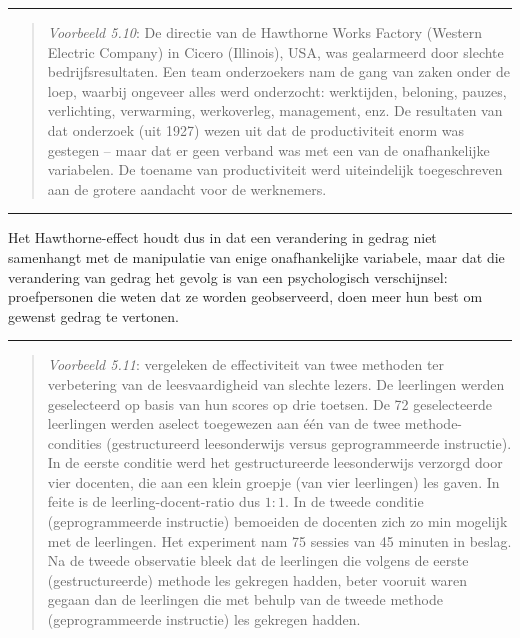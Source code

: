 \documentclass[
]{book}
\begin{document}
\begin{center}\rule{0.5\linewidth}{0.5pt}\end{center}

\begin{quote}
\emph{Voorbeeld 5.10}: De directie
van de Hawthorne Works Factory (Western Electric Company) in Cicero
(Illinois), USA, was gealarmeerd door slechte bedrijfsresultaten. Een
team onderzoekers nam de gang van zaken onder de loep, waarbij ongeveer
alles werd onderzocht: werktijden, beloning, pauzes, verlichting,
verwarming, werkoverleg, management, enz. De resultaten van dat
onderzoek (uit 1927) wezen uit dat de productiviteit enorm was gestegen
-- maar dat er geen verband was met een van de onafhankelijke
variabelen. De toename van productiviteit werd uiteindelijk
toegeschreven aan de grotere aandacht voor de werknemers.
\end{quote}

\begin{center}\rule{0.5\linewidth}{0.5pt}\end{center}

Het Hawthorne-effect houdt dus in dat een verandering in gedrag niet
samenhangt met de manipulatie van enige onafhankelijke variabele, maar
dat die verandering van gedrag het gevolg is van een psychologisch
verschijnsel: proefpersonen die weten dat ze worden geobserveerd, doen
meer hun best om gewenst gedrag te vertonen.

\begin{center}\rule{0.5\linewidth}{0.5pt}\end{center}

\begin{quote}
\emph{Voorbeeld 5.11}: \citep{RDCPW78}
vergeleken de effectiviteit van twee methoden ter verbetering van de
leesvaardigheid van slechte lezers. De leerlingen werden geselecteerd op
basis van hun scores op drie toetsen. De 72 geselecteerde leerlingen
werden aselect toegewezen aan één van de twee methode-condities
(gestructureerd leesonderwijs versus geprogrammeerde instructie). In de
eerste conditie werd het gestructureerde leesonderwijs verzorgd door
vier docenten, die aan een klein groepje (van vier leerlingen) les
gaven. In feite is de leerling-docent-ratio dus \(1:1\). In de tweede
conditie (geprogrammeerde instructie) bemoeiden de docenten zich zo min
mogelijk met de leerlingen. Het experiment nam 75 sessies van 45 minuten
in beslag. Na de tweede observatie bleek dat de leerlingen die volgens
de eerste (gestructureerde) methode les gekregen hadden, beter vooruit
waren gegaan dan de leerlingen die met behulp van de tweede methode
(geprogrammeerde instructie) les gekregen hadden.
\end{quote}
\end{document}
